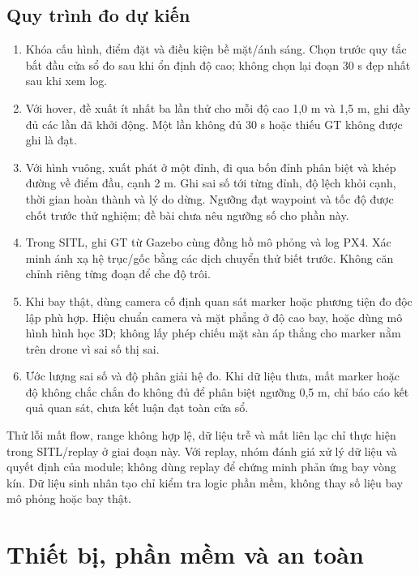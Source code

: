 \documentclass[a4paper,12pt]{article}
\begin{document}
\subsection{Quy trình đo dự kiến}
\begin{enumerate}
\item Khóa cấu hình, điểm đặt và điều kiện bề mặt/ánh sáng. Chọn trước quy tắc bắt đầu cửa sổ đo sau khi ổn định độ cao; không chọn lại đoạn 30 s đẹp nhất sau khi xem log.
\item Với hover, đề xuất ít nhất ba lần thử cho mỗi độ cao 1,0 m và 1,5 m, ghi đầy đủ các lần đã khởi động. Một lần không đủ 30 s hoặc thiếu GT không được ghi là đạt.
\item Với hình vuông, xuất phát ở một đỉnh, đi qua bốn đỉnh phân biệt và khép đường về điểm đầu, cạnh 2 m. Ghi sai số tới từng đỉnh, độ lệch khỏi cạnh, thời gian hoàn thành và lý do dừng. Ngưỡng đạt waypoint và tốc độ được chốt trước thử nghiệm; đề bài chưa nêu ngưỡng số cho phần này.
\item Trong SITL, ghi GT từ Gazebo cùng đồng hồ mô phỏng và log PX4. Xác minh ánh xạ hệ trục/gốc bằng các dịch chuyển thử biết trước. Không căn chỉnh riêng từng đoạn để che độ trôi.
\item Khi bay thật, dùng camera cố định quan sát marker hoặc phương tiện đo độc lập phù hợp. Hiệu chuẩn camera và mặt phẳng ở độ cao bay, hoặc dùng mô hình hình học 3D; không lấy phép chiếu mặt sàn áp thẳng cho marker nằm trên drone vì sai số thị sai.
\item Ước lượng sai số và độ phân giải hệ đo. Khi dữ liệu thưa, mất marker hoặc độ không chắc chắn đo không đủ để phân biệt ngưỡng 0,5 m, chỉ báo cáo kết quả quan sát, chưa kết luận đạt toàn cửa sổ.
\end{enumerate}

Thử lỗi mất flow, range không hợp lệ, dữ liệu trễ và mất liên lạc chỉ thực hiện trong SITL/replay ở giai đoạn này. Với replay, nhóm đánh giá xử lý dữ liệu và quyết định của module; không dùng replay để chứng minh phản ứng bay vòng kín. Dữ liệu sinh nhân tạo chỉ kiểm tra logic phần mềm, không thay số liệu bay mô phỏng hoặc bay thật.

\section{Thiết bị, phần mềm và an toàn}
\end{document}
